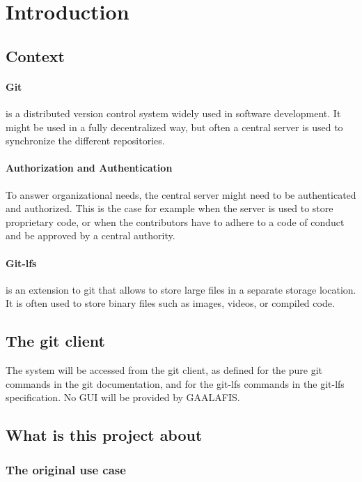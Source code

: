 \section{Introduction}

\subsection{Context}

\paragraph{Git} is a distributed version control system widely used in software development. It might be used in a fully decentralized way, but often a central server is used to synchronize the different repositories.

\paragraph{Authorization and Authentication} To answer organizational needs, the central server might need to be authenticated and authorized. This is the case for example when the server is used to store proprietary code, or when the contributors have to adhere to a code of conduct and be approved by a central authority.

\paragraph{Git-lfs} is an extension to git that allows to store large files in a separate storage location. It is often used to store binary files such as images, videos, or compiled code.

\subsection{The git client}

The system will be accessed from the git client, as defined for the pure git commands in the git documentation, and for the git-lfs commands in the git-lfs specification. No GUI will be provided by GAALAFIS.

\subsection{What is this project about}

\subsubsection{The original use case}

